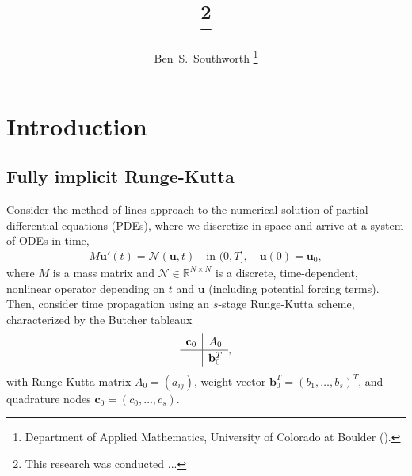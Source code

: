 \documentclass[review]{siamart}
\title{{\TheTitle}\thanks{This research was conducted ...
  }}
\author{%
  Ben~S.~Southworth
  \thanks{Department of Applied Mathematics,
          University of Colorado at Boulder
          (\email{ben.s.southworth@gmail.com}).}
}
\begin{document}
\maketitle
\allowdisplaybreaks

\begin{abstract}

\end{abstract}


\section{Introduction}

\subsection{Fully implicit Runge-Kutta}

Consider the method-of-lines approach to the numerical solution of partial differential
equations (PDEs), where we discretize in space and arrive at a system of ODEs in time,
%
\begin{align}\label{eq:problem}
	M\mathbf{u}'(t) =  \mathcal{N}(\mathbf{u},t) \quad\text{in }(0,T], \quad \mathbf{u}(0) = \mathbf{u}_0,
\end{align}
%
where $M$ is a mass matrix and $\mathcal{N}\in\mathbb{R}^{N\times N}$ is a discrete, time-dependent, nonlinear operator depending on $t$ and $\mathbf{u}$ (including potential
forcing terms). Then, consider time propagation using an $s$-stage Runge-Kutta scheme,
characterized by the Butcher tableaux 
%
\begin{align*}
	\renewcommand\arraystretch{1.2}
	\begin{array}
	{c|c}
	\mathbf{c}_0 & A_0\\
	\hline
	& \mathbf{b}_0^T
	\end{array},
\end{align*}
%
with Runge-Kutta matrix $A_0 = (a_{ij})$, weight vector $\mathbf{b}_0^T = (b_1, \ldots, b_s)^T$,
and quadrature nodes $\mathbf{c}_0 = (c_0, \ldots, c_s)$.
\end{document}
